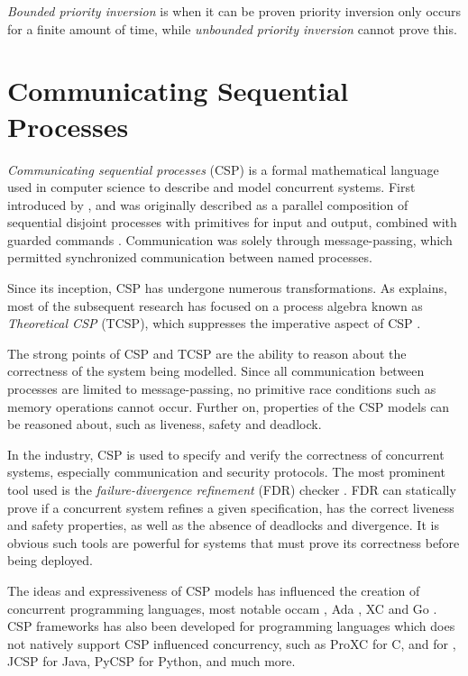 \textit{Bounded priority inversion} is when it can be proven priority inversion only occurs for a finite amount of time, while \textit{unbounded priority inversion} cannot prove this. 


\section{Communicating Sequential Processes}
\label{sec:csp}


\textit{Communicating sequential processes} (CSP) is a formal mathematical language used in computer science to describe and model concurrent systems. First introduced by \citet{hoare1978communicating}, and was originally described as a parallel composition of sequential disjoint processes with primitives for input and output, combined with guarded commands \citep{dijkstra1975guarded}. Communication was solely through message\hyp{}passing, which permitted synchronized communication between named processes.

Since its inception, CSP has undergone numerous transformations. As \citet{abdallah2005communicating} explains, most of the subsequent research has focused on a process algebra known as \textit{Theoretical CSP} (TCSP), which suppresses the imperative aspect of CSP \citep{brookes1984theory}. 

The strong points of CSP and TCSP are the ability to reason about the correctness of the system being modelled. Since all communication between processes are limited to message\hyp{}passing, no primitive race conditions such as memory operations cannot occur. Further on, properties of the CSP models can be reasoned about, such as liveness, safety and deadlock.

In the industry, CSP is used to specify and verify the correctness of concurrent systems, especially communication and security protocols. The most prominent tool used is the \textit{failure\hyp{}divergence refinement} (FDR) checker \citep{manual2000failures}. FDR can statically prove if a concurrent system refines a given specification, has the correct liveness and safety properties, as well as the absence of deadlocks and divergence. It is obvious such tools are powerful for systems that must prove its correctness before being deployed.

The ideas and expressiveness of CSP models has influenced the creation of concurrent programming languages, most notable occam \citep{inmos1988occam}, Ada \citep{ledgard1983reference}, XC \citep{douglas2009programming} and Go \citep{go2009go}. CSP frameworks has also been developed for programming languages which does not natively support CSP influenced concurrency, such as ProXC \citep{pettersen2016proxc} for C,  \citep{brown2007c++csp2} and \Cppcsp{} \citep{chalmers2016cppcsp} for \Cpp{}, JCSP \citep{welch2007jcsp} for Java, PyCSP \citep{bjorndalen2007pycsp} for Python, and much more.

